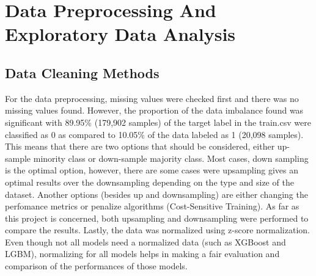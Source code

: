 \documentclass[journal,twoside,web]{ieeecolor}
\begin{document}
\section{Data Preprocessing And Exploratory Data Analysis}


\subsection{Data Cleaning Methods}
For the data preprocessing, missing values were checked first and there was no missing values found. However, the proportion of the data imbalance found was significant with 89.95\% (179,902 samples) of the target label in the train.csv were classified as 0 as compared to 10.05\% of the data labeled as 1 (20,098 samples). This means that there are two options that should be considered, either up-sample minority class or down-sample majority class. Most cases, down sampling is the optimal option, however, there are some cases were upsampling gives an optimal results over the downsampling depending on the type and size of the dataset. Another options (besides up and downsampling) are either changing the perfomance metrics or penalize algorithms (Cost-Sensitive Training). As far as this project is concerned, both upsampling and downsampling were performed to compare the results. Lastly, the data was normalized using z-score normalization. Even though not all models need a normalized data (such as XGBoost and LGBM), normalizing for all models helps in making a fair evaluation and comparison of the performances of those models. 

\end{document}
